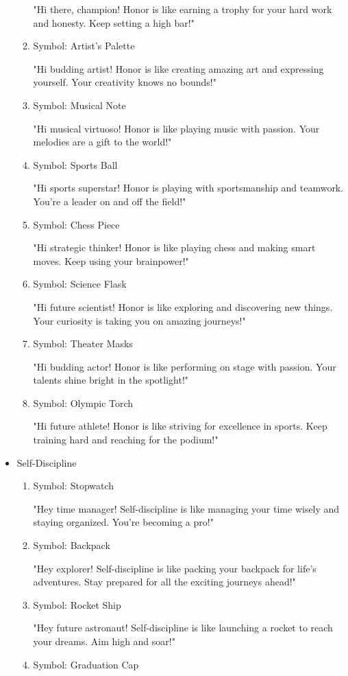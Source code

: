 \documentclass[14pt, letterpaper, twoside]{article}
\begin{document}
\begin{itemize}
\begin{enumerate}
		"Hi there, champion! Honor is like earning a trophy for your hard work and
		honesty. Keep setting a high bar!"
		\item Symbol: Artist's Palette 
		
		"Hi budding artist! Honor is like creating amazing art and expressing yourself.
		Your creativity knows no bounds!"
		\item Symbol: Musical Note 
		
		"Hi musical virtuoso! Honor is like playing music with passion. Your melodies are
		a gift to the world!"
		\item Symbol: Sports Ball 
		
		"Hi sports superstar! Honor is playing with sportsmanship and teamwork. You're a
		leader on and off the field!"
		\item Symbol: Chess Piece 
		
		"Hi strategic thinker! Honor is like playing chess and making smart moves. Keep
		using your brainpower!"
		\item Symbol: Science Flask 
		
		"Hi future scientist! Honor is like exploring and discovering new things. Your
		curiosity is taking you on amazing journeys!"
		\item Symbol: Theater Masks 
		
		"Hi budding actor! Honor is like performing on stage with passion. Your talents
		shine bright in the spotlight!"
		\item Symbol: Olympic Torch 
		
		"Hi future athlete! Honor is like striving for excellence in sports. Keep training
		hard and reaching for the podium!"
		\end{enumerate}
	\item Self-Discipline
		\begin{enumerate}
		\item Symbol: Stopwatch 
	
		"Hey time manager! Self-discipline is like managing your time wisely and staying
		organized. You're becoming a pro!"
		\item Symbol: Backpack 
	
		"Hey explorer! Self-discipline is like packing your backpack for life's 
		adventures. Stay prepared for all the exciting journeys ahead!"
		\item Symbol: Rocket Ship 
		
		"Hey future astronaut! Self-discipline is like launching a rocket to reach your
		dreams. Aim high and soar!"
		\item Symbol: Graduation Cap 
		

\end{enumerate}
\end{itemize}
\end{document}
